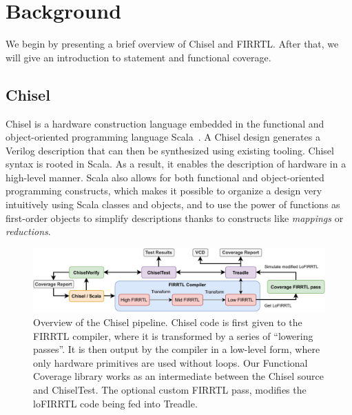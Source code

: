 \documentclass[a4paper]{IEEEtran}
\newcommand{\martin}[1]{{\color{blue} Martin: #1}}
\begin{document}
\section{Background}
\label{sec:background}
We begin by presenting a brief overview of Chisel and FIRRTL. 
After that, we will give an introduction to statement and functional coverage.


\subsection{Chisel}
Chisel is a hardware construction language embedded in the functional and object-oriented programming language Scala~\cite{chisel:dac2012, chisel:book, Scala}. 
A Chisel design generates a Verilog description that can then be synthesized using existing tooling. 
Chisel syntax is rooted in Scala. As a result, it enables the description of hardware in a high-level manner. 
Scala also allows for both functional and object-oriented programming constructs, which makes it possible to organize a design very intuitively using Scala classes and objects, and to use the power of functions as first-order objects to simplify descriptions thanks to constructs like \textit{mappings} or \textit{reductions}.

\begin{figure}[t]
    \centering
    \includegraphics[trim=0 0.3cm 0 0.3cm, width=1\textwidth]{Chisel_FIRRTL_VERILOG_Coverage.pdf}
    \caption{Overview of the Chisel pipeline. Chisel code is first given to the FIRRTL compiler, where it is transformed by a series of ``lowering passes''. It is then output by the compiler in a low-level form, where only hardware primitives are used without loops. Our Functional Coverage library works as an intermediate between the Chisel source and ChiselTest. The optional custom FIRRTL pass, modifies the loFIRRTL code being fed into Treadle.}
\label{fig:chisel}
\end{figure}
\end{document}
